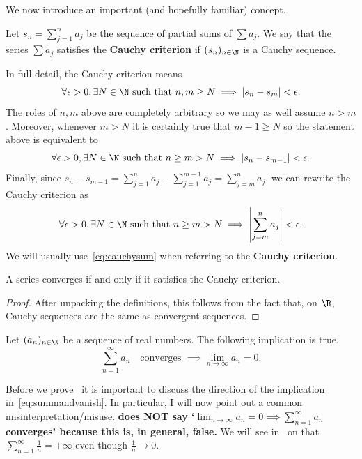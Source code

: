 We now introduce an important (and hopefully familiar) concept.
\begin{defn}
	\label{defn:cauchysum}
	Let $s_n = \sum_{j=1}^n a_j$ be the sequence of partial sums of $\sum a_j$. We say that the series $\sum a_j$ satisfies the \textbf{Cauchy criterion} if $(s_n)_{n\in\N}$ is a Cauchy sequence.
\end{defn}
In full detail, the Cauchy criterion means
\[
\forall \epsilon>0, \exists N\in\N \text{ such that }n,m\ge N \implies |s_n - s_m | <\epsilon.
\]
The roles of $n,m$ above are completely arbitrary so we may as well assume $n> m$. Moreover, whenever $m>N$ it is certainly true that $m-1\ge N$ so the statement above is equivalent to
\[
\forall \epsilon>0, \exists N\in\N \text{ such that }n\ge m>N \implies |s_n - s_{m-1} | <\epsilon.
\]
Finally, since $s_n- s_{m-1} = \sum_{j=1}^n a_j - \sum_{j=1}^{m-1}a_j = \sum_{j=m}^na_j$, we can rewrite the Cauchy criterion as
\begin{equation}
	\label{eq:cauchysum}
	\forall \epsilon>0, \exists N\in\N \text{ such that }n\ge m>N \implies \left|
	\sum_{j=m}^n a_j
	\right| <\epsilon.
\end{equation}
We will usually use~\eqref{eq:cauchysum} when referring to the \textbf{Cauchy criterion}.
\begin{thm}
	\label{thm:cauchysum}
	A series converges if and only if it satisfies the Cauchy criterion.
\end{thm}
\begin{proof}
	After unpacking the definitions, this follows from the fact that, on $\R$, Cauchy sequences are the same as convergent sequences.
\end{proof}
\begin{cor}
	\label{cor:summandvanish}
	Let $(a_n)_{n\in\N}$ be a sequence of real numbers. The following implication is true.
	\begin{equation}
		\label{eq:summandvanish}
		\sum_{n=1}^\infty a_n \quad \text{converges }\implies \lim_{n\to\infty}a_n = 0.
	\end{equation}
\end{cor}
Before we prove~ it is important to discuss the direction of the implication in~\eqref{eq:summandvanish}. In particular, I will now point out a common misinterpretation/misuse. \textbf{ does NOT say `$\lim_{n\to \infty}a_n = 0 \implies \sum_{n=1}^\infty a_n$ converges' because this is, in general, false.} We will see in~ on that $\sum_{n=1}^\infty \frac{1}{n} = +\infty$ even though $\frac{1}{n}\to 0$.
